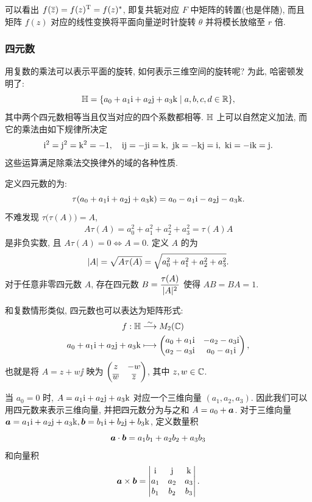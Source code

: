 可以看出 $f(\overline z)=f(z)^{\mathrm{T}}=f(z)^*$, 即复共轭对应 $F$ 中矩阵的转置(也是伴随), 而且矩阵 $f(z)$ 对应的线性变换将平面向量逆时针旋转 $\theta$ 并将模长放缩至 $r$ 倍.


\subsubsection{四元数}
\label{sssec:quaternion-number}

用复数的乘法可以表示平面的旋转, 如何表示三维空间的旋转呢?
为此, 哈密顿发明了:
\[
  {\mathbb{H}}=\{a_0+a_1\mathrm{i}+a_2\mathrm{j}+a_3\mathrm{k}\mid a,b,c,d\in{\mathbb{R}}\},
\]
其中两个四元数相等当且仅当对应的四个系数都相等.
${\mathbb{H}}$ 上可以自然定义加法, 而它的乘法由如下规律所决定
\[
  \ii^2=\jj^2=\kk^2=-1,\quad 
  \ii\jj=-\jj\ii=\kk,\ 
  \jj\kk=-\kk\jj=\ii,\ 
  \kk\ii=-\ii\kk=\jj.
\]
这些运算满足除乘法交换律外的域的各种性质.

定义四元数的为:
\[
  \tau(a_0+a_1\mathrm{i}+a_2\mathrm{j}+a_3\mathrm{k})
  =a_0-a_1\mathrm{i}-a_2\mathrm{j}-a_3\mathrm{k}.
\]
不难发现 $\tau\bigl(\tau(A)\bigr)=A$,
\begin{align*}
   A\tau(A)
  =a_0^2+a_1^2+a_2^2+a_3^2
  =\tau(A)A
\end{align*}
是非负实数, 且 $A\tau(A)=0\iff A=0$. 
定义 $A$ 的为
\[
  \lvert A\rvert=\sqrt{A\tau(A)}=\sqrt{a_0^2+a_1^2+a_2^2+a_3^2}.
\]
对于任意非零四元数 $A$, 存在四元数 $B=\dfrac{\tau(A)}{\lvert A\rvert^2}$ 使得 $AB=BA=1$. 

和复数情形类似, 四元数也可以表达为矩阵形式:
\begin{equation}
  \label{eq:quaternion-matrix}
  \begin{aligned}
    f:{\mathbb{H}}&\stackrel{\sim}{\longrightarrow} M_2({\mathbb{C}})\\
    a_0+a_1\mathrm{i}+a_2\mathrm{j}+a_3\mathrm{k}&\longmapsto \begin{pmatrix}
      a_0+a_1\mathrm{i}&-a_2-a_3\mathrm{i}\\
      a_2-a_3\mathrm{i}&a_0-a_1\mathrm{i}
    \end{pmatrix},
  \end{aligned}
\end{equation}
也就是将 $A=z+w\jj$ 映为 $\begin{pmatrix}
  z&-w\\\overline w&\overline z
\end{pmatrix}$, 其中 $z,w\in{\mathbb{C}}$.

当 $a_0=0$ 时, $A=a_1\mathrm{i}+a_2\mathrm{j}+a_3\mathrm{k}$ 对应一个三维向量 $(a_1,a_2,a_3)$.
因此我们可以用四元数来表示三维向量, 并把四元数分为与之和 $A=a_0+{\boldsymbol{a}}$.
对于三维向量 ${\boldsymbol{a}}=a_1\mathrm{i}+a_2\mathrm{j}+a_3\mathrm{k}, {\boldsymbol{b}}=b_1\mathrm{i}+b_2\mathrm{j}+b_3\mathrm{k}$, 定义数量积
\[
  {\boldsymbol{a}}\cdot{\boldsymbol{b}}=a_1b_1+a_2b_2+a_3b_3
\]
和向量积
\[
  {\boldsymbol{a}}\times{\boldsymbol{b}}=\begin{vmatrix}
    \mathrm{i}&\mathrm{j}&\mathrm{k}\\
    a_1&a_2&a_3\\
    b_1&b_2&b_3
  \end{vmatrix}.
\]

